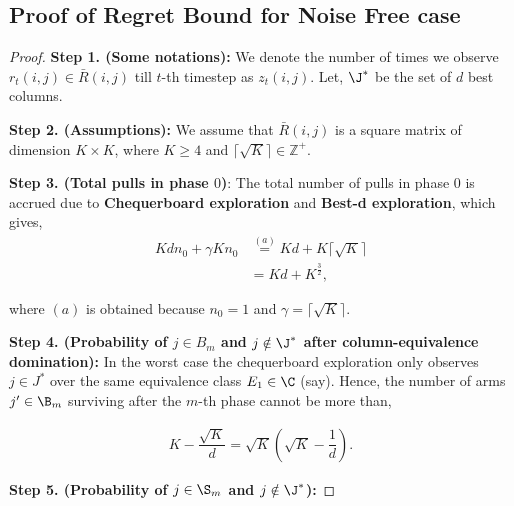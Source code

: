 
\subsection{Proof of Regret Bound for Noise Free case}

\begin{proof}
\textbf{Step 1. (Some notations):} We denote the number of times we observe $r_t\left( i ,j \right) \in \bar{R}\left( i  ,j \right)$ till $t$-th timestep as $z_t\left( i,j\right)$. Let, $\J^*$ be the set of $d$ best columns.

\textbf{Step 2. (Assumptions): } We assume that $\bar{R}(i,j)$ is a square matrix of dimension $K\times K$, where $K \geq 4$ and $\lceil\sqrt{K} \rceil \in \mathbb{Z}^+$.

\textbf{Step 3. (Total pulls in phase $0$)}: The total number of pulls in phase $0$ is accrued due to \textbf{Chequerboard exploration} and \textbf{Best-d exploration}, which gives,
\begin{align*}
Kd n_0 + \gamma Kn_0 & \overset{(a)}{=} Kd + K\lceil\sqrt{K} \rceil\\
&= Kd + K^{\frac{3}{2}},
\end{align*}

where $(a)$ is obtained because $n_0 = 1$ and $\gamma = \lceil\sqrt{K} \rceil$.

\textbf{Step 4. (Probability of $j\in B_m$ and $j\notin \J^*$ after column-equivalence domination):} In the worst case the chequerboard exploration only observes $j\in J^*$ over the same equivalence class $E_1\in \C$ (say). Hence, the number of arms $j'\in \B_m$ surviving after the $m$-th phase cannot be more than,

\begin{align*}
K - \dfrac{\sqrt{K}}{d} = \sqrt{K}\left(\sqrt{K} - \dfrac{1}{d}\right).
\end{align*} 

\textbf{Step 5. (Probability of  $j\in \S_m$ and $j\notin \J^*$):} 

\end{proof}